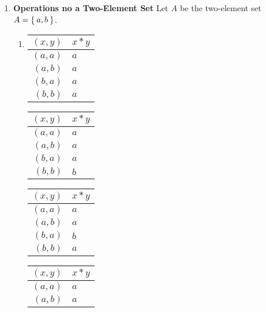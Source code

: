 \begin{enumerate}[label={\Alph*.},font={\bfseries}]
  \item {\bf Operations no a Two-Element Set}
    Let $A$ be the two-element set $A=\Set{a,b}$.
    \begin{enumerate}[label={\arabic*},font={\bfseries}]
      \item
        \begin{minipage}[h]{.25\textwidth}
          \begin{tabular}{ r | l }
            $(x,y)$ & $x*y$ \\
            \hline
            $(a,a)$ & $a$ \\
            $(a,b)$ & $a$ \\
            $(b,a)$ & $a$ \\
            $(b,b)$ & $a$
          \end{tabular}
        \end{minipage}
        \begin{minipage}[h]{.25\textwidth}
          \begin{tabular}{ r | l }
            $(x,y)$ & $x*y$ \\
            \hline
            $(a,a)$ & $a$ \\
            $(a,b)$ & $a$ \\
            $(b,a)$ & $a$ \\
            $(b,b)$ & $b$
          \end{tabular}
        \end{minipage}
        \begin{minipage}[h]{.25\textwidth}
          \begin{tabular}{ r | l }
            $(x,y)$ & $x*y$ \\
            \hline
            $(a,a)$ & $a$ \\
            $(a,b)$ & $a$ \\
            $(b,a)$ & $b$ \\
            $(b,b)$ & $a$
          \end{tabular}
        \end{minipage}
        \begin{minipage}[h]{.25\textwidth}
          \begin{tabular}{ r | l }
            $(x,y)$ & $x*y$ \\
            \hline
            $(a,a)$ & $a$ \\
            $(a,b)$ & $a$ \\

\end{tabular}
\end{minipage}
\end{enumerate}
\end{enumerate}
